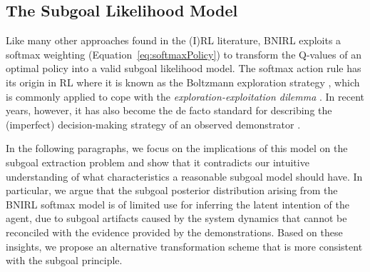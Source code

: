 \documentclass[twoside,11pt]{article}
\begin{document}
\subsection{The Subgoal Likelihood Model}
\label{sec:actionLikelihood}
%
Like many other approaches found in the (I)RL literature, BNIRL exploits a softmax weighting (Equation~\ref{eq:softmaxPolicy}) to transform the Q-values of an optimal policy into a valid subgoal likelihood model.
%
%
%
The softmax action rule has its origin in RL where it is known as the Boltzmann exploration strategy \citep{cesa2017boltzmann,sutton1998reinforcement}, which is commonly applied %
%
to %
cope with the %
\textit{exploration-exploitation dilemma} \citep{ghavamzadeh2015bayesian}. 
In recent years, however, it has %
also become the de facto standard for describing the %
%
(imperfect) decision-making strategy of %
an observed demonstrator \citep[see, for example,][]{dimitrakakis2011bayesian,ramachandran2007bayesian,rothkopf2011preference,NIPS2012_4737,neu2007,babes2011apprenticeship}.

In the following paragraphs, 
%
%
%
we focus on the implications of this %
model on the subgoal extraction problem 
and show that it contradicts our intuitive understanding of what characteristics a reasonable subgoal model should have. %
In particular, we argue that the subgoal posterior distribution arising from the %
BNIRL softmax model is of limited use %
for inferring the latent intention of the agent, due to subgoal artifacts caused by the system dynamics that %
cannot be reconciled with the evidence %
%
provided by the demonstrations. Based on these insights, we  propose an alternative transformation scheme that is more consistent with the subgoal principle. %
%
\end{document}

